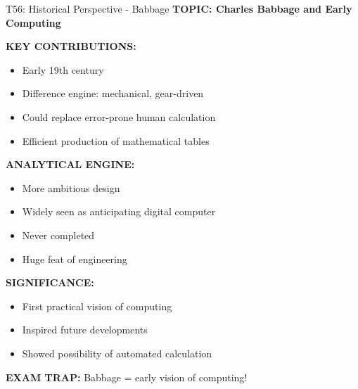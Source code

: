 \documentclass[8pt]{beamer}
\begin{document}
	\begin{frame}{T56: Historical Perspective - Babbage}
		\fontsize{6.5}{7.5}\selectfont
		\textbf{TOPIC: Charles Babbage and Early Computing}
		
		\vspace{0.1cm}
		\textbf{KEY CONTRIBUTIONS:}
		\begin{itemize}
			\item Early 19th century
			\item Difference engine: mechanical, gear-driven
			\item Could replace error-prone human calculation
			\item Efficient production of mathematical tables
		\end{itemize}
		
		\vspace{0.1cm}
		\textbf{ANALYTICAL ENGINE:}
		\begin{itemize}
			\item More ambitious design
			\item Widely seen as anticipating digital computer
			\item Never completed
			\item Huge feat of engineering
		\end{itemize}
		
		\vspace{0.1cm}
		\textbf{SIGNIFICANCE:}
		\begin{itemize}
			\item First practical vision of computing
			\item Inspired future developments
			\item Showed possibility of automated calculation
		\end{itemize}
		
		\textcolor{myred}{\textbf{EXAM TRAP:}} Babbage = \textcolor{myblue}{early vision of computing}!
	\end{frame}
	
\end{document}
